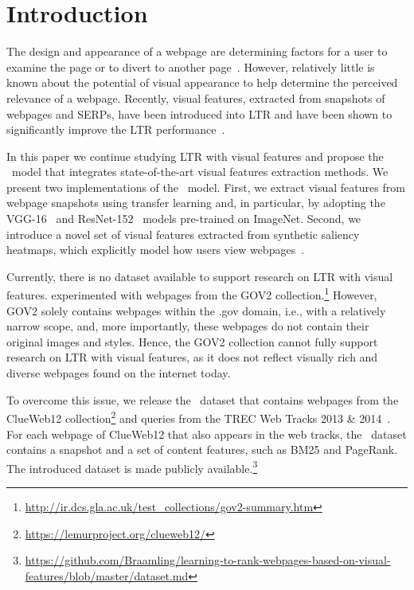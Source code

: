 
\section{Introduction}
The design and appearance of a webpage are determining factors for a user to examine the page or to divert to another page~\cite{nielsen1999designing,nielsen2006f,pernice2017f,wang2014eye}.
However, relatively little is known about the potential of visual appearance to help determine the perceived relevance of a webpage.
Recently, visual features, extracted from snapshots of webpages and \acp{SERP}, have been introduced into \acf{LTR}
and have been shown to significantly improve the \ac{LTR} performance~\cite{fan2017learning,zhang2018relevance}.

In this paper we continue studying \ac{LTR} with visual features and propose the \modelnamef~model
that integrates state-of-the-art visual features extraction methods.
We present two implementations of the \modelname~model.
First, we extract visual features from webpage snapshots using transfer learning and, in particular, by adopting the VGG-16~\cite{simonyan2014very} and ResNet-152~\cite{he2016deep} models pre-trained on ImageNet.
Second, we introduce a novel set of visual features extracted from synthetic saliency heatmaps, which explicitly model how users view webpages~\cite{shan2017two}.

Currently, there is no dataset available to support research on \ac{LTR} with visual features.
\citet{fan2017learning} experimented with webpages from the GOV2 collection.\footnote{\url{http://ir.dcs.gla.ac.uk/test_collections/gov2-summary.htm}}
However, GOV2 solely contains webpages within the .gov domain, i.e.,  with a relatively narrow scope,
and, more importantly, these webpages do not contain their original images and styles.
Hence, the GOV2 collection cannot fully support research on \ac{LTR} with visual features, as it does not reflect visually rich and diverse webpages found on the internet today.

To overcome this issue, we release the \datasetname~dataset that contains webpages from the ClueWeb12 collection\footnote{\url{https://lemurproject.org/clueweb12/}}
and queries from the TREC Web Tracks 2013 \& 2014~\cite{collins2013trec,collins2015trec}.
For each webpage of ClueWeb12 that also appears in the web tracks, the \datasetname~dataset contains a snapshot
and a set of content features, such as BM25 and PageRank.
The introduced dataset is made publicly available.\footnote{\url{https://github.com/Braamling/learning-to-rank-webpages-based-on-visual-features/blob/master/dataset.md}}


